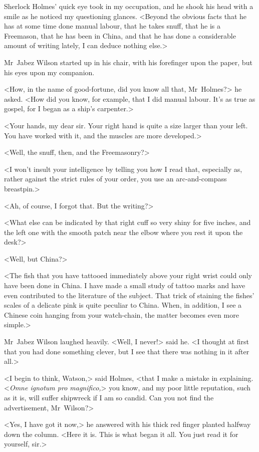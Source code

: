 Sherlock Holmes' quick eye took in my occupation, and he shook his head with a smile as he noticed my questioning glances. <Beyond the obvious facts that he has at some time done manual labour, that he takes snuff, that he is a Freemason, that he has been in China, and that he has done a considerable amount of writing lately, I can deduce nothing else.>

Mr~Jabez Wilson started up in his chair, with his forefinger upon the paper, but his eyes upon my companion.

<How, in the name of good-fortune, did you know all that, Mr~Holmes?> he asked. <How did you know, for example, that I did manual labour. It's as true as gospel, for I began as a ship's carpenter.>

<Your hands, my dear sir. Your right hand is quite a size larger than your left. You have worked with it, and the muscles are more developed.>

<Well, the snuff, then, and the Freemasonry?>

<I won't insult your intelligence by telling you how I read that, especially as, rather against the strict rules of your order, you use an arc-and-compass breastpin.>

<Ah, of course, I forgot that. But the writing?>

<What else can be indicated by that right cuff so very shiny for five inches, and the left one with the smooth patch near the elbow where you rest it upon the desk?>

<Well, but China?>

<The fish that you have tattooed immediately above your right wrist could only have been done in China. I have made a small study of tattoo marks and have even contributed to the literature of the subject. That trick of staining the fishes' scales of a delicate pink is quite peculiar to China. When, in addition, I see a Chinese coin hanging from your watch-chain, the matter becomes even more simple.>

Mr~Jabez Wilson laughed heavily. <Well, I never!> said he. <I thought at first that you had done something clever, but I see that there was nothing in it after all.>

<I begin to think, Watson,> said Holmes, <that I make a mistake in explaining. <\textit{Omne ignotum pro magnifico,}> you know, and my poor little reputation, such as it is, will suffer shipwreck if I am so candid. Can you not find the advertisement, Mr~Wilson?>

<Yes, I have got it now,> he answered with his thick red finger planted halfway down the column. <Here it is. This is what began it all. You just read it for yourself, sir.>

